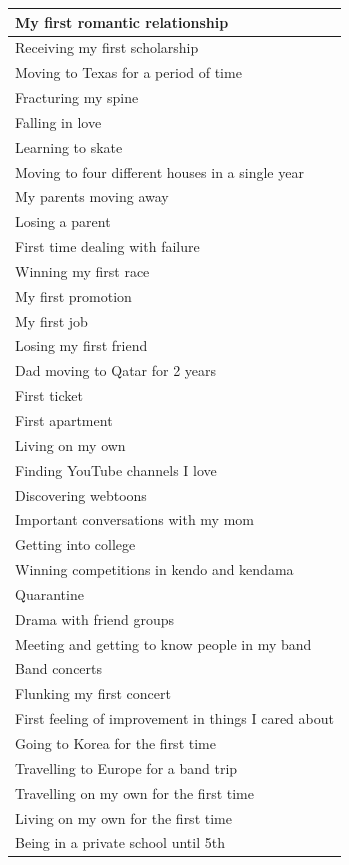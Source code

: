 \documentclass[
  .7em,
  letterpaper,
  DIV=11,
  numbers=noendperiod]{scrartcl}
\begin{document}
\begin{table}
\begin{tabular}{l}
\hline
My first romantic relationship\\
\hline
Receiving my first scholarship\\
\hline
Moving to Texas for a period of time\\
\hline
Fracturing my spine\\
\hline
Falling in love\\
\hline
Learning to skate\\
\hline
Moving to four different houses in a single year\\
\hline
My parents moving away\\
\hline
Losing a parent\\
\hline
First time dealing with failure\\
\hline
Winning my first race\\
\hline
My first promotion\\
\hline
My first job\\
\hline
Losing my first friend\\
\hline
Dad moving to Qatar for 2 years\\
\hline
First ticket\\
\hline
First apartment\\
\hline
Living on my own\\
\hline
Finding YouTube channels I love\\
\hline
Discovering webtoons\\
\hline
Important conversations with my mom\\
\hline
Getting into college\\
\hline
Winning competitions in kendo and kendama\\
\hline
Quarantine\\
\hline
Drama with friend groups\\
\hline
Meeting and getting to know people in my band\\
\hline
Band concerts\\
\hline
Flunking my first concert\\
\hline
First feeling of improvement in things I cared about\\
\hline
Going to Korea for the first time\\
\hline
Travelling to Europe for a band trip\\
\hline
Travelling on my own for the first time\\
\hline
Living on my own for the first time\\
\hline
Being in a private school until 5th\\

\end{tabular}
\end{table}
\end{document}
